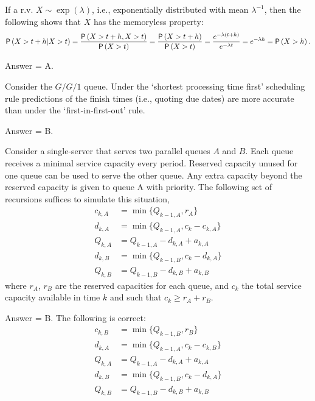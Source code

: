 \begin{exercise}[201802]
If a r.v. $X\sim\exp(\lambda)$, i.e., exponentially distributed with mean $\lambda^{-1}$, then the following shows that $X$ has the memoryless  property:
\begin{equation*}
  \P{X>t+h|X>t} = \frac{\P{X>t+h, X>t}}{\P{X>t}} = \frac{\P{X>t+h}}{\P{X>t}} = \frac{e^{-\lambda(t+h)}}{e^{-\lambda t}} = e^{-\lambda h} = \P{X>h}.
\end{equation*}

\begin{solution}
Answer = A.
\end{solution}
\end{exercise}

\begin{exercise}[201803]
Consider the $G/G/1$ queue. Under the `shortest processing time first' scheduling rule predictions of the finish times (i.e., quoting due dates) are more accurate than under the `first-in-first-out' rule.
\begin{solution}
Answer = B.
\end{solution}
\end{exercise}

\begin{exercise}[201803]
 Consider a single-server that  serves two parallel queues $A$ and $B$. Each queue receives a minimal service   capacity every period. Reserved capacity unused for one queue can be
  used to serve the other queue. Any extra capacity beyond the
  reserved capacity is given to queue A with priority. The following set
  of recursions suffices to simulate this situation,
\begin{align*}
  c_{k,A} &= \min\{Q_{ k-1, A}, r_A\}\\
d_{k,A} &= \min\{Q_{k-1, A}, c_k-c_{k,A}\}\\
Q_{k,A} &= Q_{k-1, A} - d_{k,A} + a_{k,A}\\
d_{k,B} &= \min\{Q_{k-1, B}, c_k-d_{k,A}\} \\
Q_{k,B} &= Q_{k-1, B} - d_{k,B} + a_{k,B}
\end{align*}
where $r_A$, $r_B$ are the reserved capacities for each queue, and $c_k$ the total service capacity available in time $k$ and such that $c_k \geq r_A+r_B$.

\begin{solution}
Answer = B. The following is correct: 
\begin{align*}
  c_{k,B} &= \min\{Q_{ k-1, B}, r_B\}\\
d_{k,A} &= \min\{Q_{k-1, A}, c_k-c_{k,B}\}\\
Q_{k,A} &= Q_{k-1, A} - d_{k,A} + a_{k,A}\\
d_{k,B} &= \min\{Q_{k-1, B}, c_k-d_{k,A}\}\\
Q_{k,B} &= Q_{k-1, B} - d_{k,B} + a_{k,B}
\end{align*}
\end{solution}
\end{exercise}

